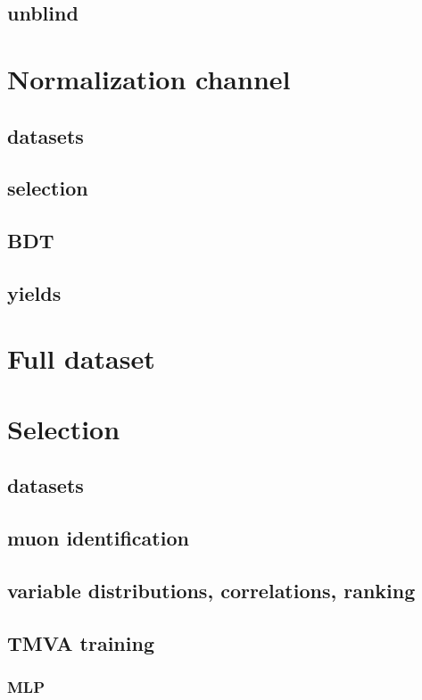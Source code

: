 \documentclass[10pt,a4paper]{article}
\begin{document}
\subsection{unblind}

\section{Normalization channel}
\subsection{datasets}
\subsection{selection}
\subsection{BDT}
\subsection{yields}

\cleardoublepage{}

\section{Full dataset}
\section{Selection}
\subsection{datasets}
\subsection{muon identification}
\subsection{variable distributions, correlations, ranking}
\subsection{TMVA training}
\subsubsection{MLP}
\end{document}
